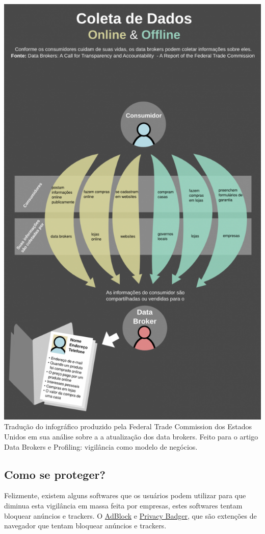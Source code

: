 \documentclass[12pt, letterpaper, DejaVuSansMono:12]{report}
\begin{document}
	\begin{center}
		\includegraphics[scale=0.60]{databrokers.png}\\
		\footnotesize Tradução do infográfico produzido pela Federal Trade Commission dos Estados Unidos em sua análise sobre a a atualização dos data brokers. Feito para o artigo Data Brokers e Profiling: vigilância como modelo de negócios.
	\end{center}

\subsection{Como se proteger?}
	Felizmente, existem alguns softwares que os usuários podem utilizar para que diminua esta vigilância em massa feita por empresas, estes softwares tentam bloquear anúncios e trackers. O \href{https://adblockplus.org/}{AdBlock} e \href{https://www.eff.org/privacybadger}{Privacy Badger}, que são extenções de navegador que tentam bloquear anúncios e trackers.\\
\end{document}
